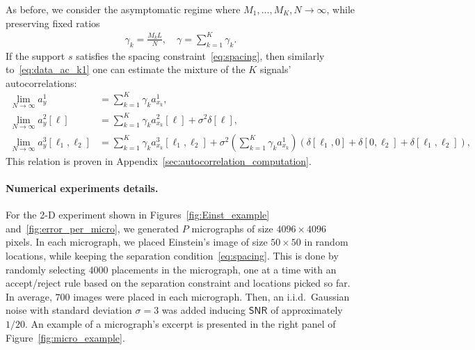 \documentclass[english,11pt]{article}
\newcommand{\1}{\mathbf{1}}
\numberwithin{equation}{section}
\theoremstyle{plain}
\theoremstyle{definition}
\theoremstyle{remark}
\theoremstyle{plain}
\theoremstyle{remark}
\theoremstyle{plain}
\theoremstyle{plain}
\newcommand{\SNR}{\ensuremath{\textsf{SNR}}}
\begin{document}
As before, we consider  the asymptomatic regime where $M_1,\ldots,M_K,N\to\infty$, while preserving fixed ratios
\begin{align}
	\gamma_k = \frac{M_k L}{N}, \quad \gamma = \sum_{k=1}^K\gamma_k.
\end{align}
If the support $s$ satisfies the spacing constraint~\eqref{eq:spacing}, then  similarly to~\eqref{eq:data_ac_k1} one can estimate the mixture of the $K$ signals'  autocorrelations:
\begin{align}
\lim_{N\to\infty} a_y^1 & = \sum_{k=1}^K\gamma_k a_{x_k}^1, \nonumber\\
\lim_{N\to\infty} a_y^2[\ell] & = \sum_{k=1}^K\gamma_k a_{x_k}^2[\ell] +\sigma^2\delta[\ell],  \label{eq:data_ac}\\
\lim_{N\to\infty} a_y^3[\ell_1,\ell_2] & = \sum_{k=1}^K\gamma_k a_{x_k}^3[\ell_1,\ell_2] + \sigma^2\left(\sum_{k=1}^K\gamma_k a_{x_k}^1\right)(\delta[\ell_1,0]+\delta[0,\ell_2]+\delta[\ell_1,\ell_2]), \nonumber
\end{align}
This relation is proven in  Appendix~\ref{sec:autocorrelation_computation}.

\paragraph{Numerical experiments details.}
For the 2-D experiment shown in Figures~\ref{fig:Einst_example} and~\ref{fig:error_per_micro}, we generated $P$ micrographs of size $4096\times 4096$ pixels. 
In each micrograph, we placed Einstein's image of size $50\times 50$  in random locations, while keeping the separation condition~\eqref{eq:spacing}.  
This is done by randomly selecting $4000$ placements in the micrograph, one at a time with
an accept/reject rule based on the separation constraint and locations picked so far. In average, $700$ images were placed in each micrograph.   
Then, an i.i.d.\ Gaussian noise with standard deviation $\sigma=3$ was added inducing $\SNR$ of approximately $1/20$. An example of a micrograph's excerpt is presented in the right panel of Figure~\ref{fig:micro_example}.
\end{document}

